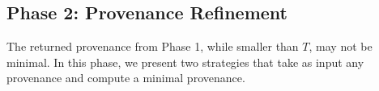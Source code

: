



\vspace{-6mm}
\subsection{Phase 2: Provenance Refinement}  
The returned provenance from Phase 1, while smaller than $T$,  may not be minimal. In this phase, we present two strategies that take as input any provenance and compute a minimal provenance.

